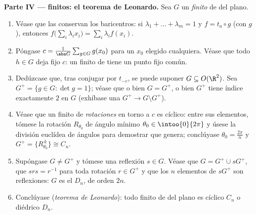 \begin{problem}
\medskip
\noindent\textbf{Parte IV ---  finitos: el teorema de
Leonardo.} Sea $G$ un  \emph{finito} de  del plano.
\begin{enumerate}[resume]
  \item Véase que las  conservan los baricentros: si
        $\lambda_1 + \dots + \lambda_m = 1$ y $f = t_a \circ g$ (con
        $g$ ), entonces
        $f\bigl(\sum_i \lambda_i x_i\bigr) = \sum_i \lambda_i f(x_i)$.
  \item Póngase $c = \frac{1}{\abs G}\sum_{g \in G} g(x_0)$ para un
        $x_0$ elegido cualquiera. Véase que todo $h \in G$ deja fijo
        $c$: un  finito de  tiene un punto fijo común.
  \item Dedúzcase que, tras conjugar por $t_{-c}$, se puede suponer
        $G \subseteq O(\R^2)$. Sea $G^{+} = \{g \in G : \det g =
        1\}$; véase que o bien $G = G^{+}$, o bien $G^{+}$ tiene
        índice exactamente $2$ en $G$ (exhíbase una 
        $G^+ \to G \setminus G^+$).
  \item Véase que un  finito de \emph{rotaciones} en torno a
        $c$ es cíclico: entre sus elementos, tómese la rotación
        $R_{\theta_0}$ de ángulo mínimo
        $\theta_0 \in \intoo{0}{2\pi}$ y úsese la división euclídea
        de ángulos para demostrar que genera; conclúyase
        $\theta_0 = \frac{2\pi}n$ y
        $G^{+} = \{R_{\theta_0}^{\,k}\} \cong C_n$.
  \item Supóngase $G \neq G^{+}$ y tómese una reflexión $s \in G$.
        Véase que $G = G^{+} \cup sG^{+}$, que $s r s = r^{-1}$ para
        toda rotación $r \in G^{+}$ y que los $n$ elementos de
        $sG^{+}$ son reflexiones: $G$ es el \emph{}
        $D_n$, de orden $2n$.
  \item Conclúyase (\emph{teorema de Leonardo}): todo  finito
        de  del plano es cíclico $C_n$ o diédrico $D_n$.
\end{enumerate}


\end{problem}
